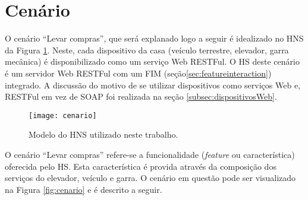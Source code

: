 \section{Cenário}
\label{sec:cenario}
O cenário ``Levar compras'', que será explanado logo a seguir é idealizado no HNS da Figura \ref{fig:hnsworkmodel}. Neste, cada dispositivo da casa (veículo terrestre, elevador, garra mecânica) é disponibilizado como um serviço Web RESTFul. O HS deste cenário é um servidor Web RESTFul com um FIM (seção\ref{sec:featureinteraction}) integrado. A discussão do motivo de se utilizar dispositivos como serviços Web e, RESTFul em vez de SOAP foi realizada na seção \ref{subsec:dispositivosWeb}.

\begin{figure}[!htb] \centering 
  \centering
  \texttt{[image: cenario]} 
  \caption{Modelo do HNS utilizado neste trabalho.} 
  \label{fig:hnsworkmodel}
\end{figure}

O cenário ``Levar compras'' refere-se a funcionalidade (\textit{feature} ou característica)  oferecida pelo HS. Esta característica é provida através da composição dos serviços do elevador, veículo e garra. O cenário em questão pode ser visualizado na Figura \ref{fig:cenario} e é descrito a seguir.

